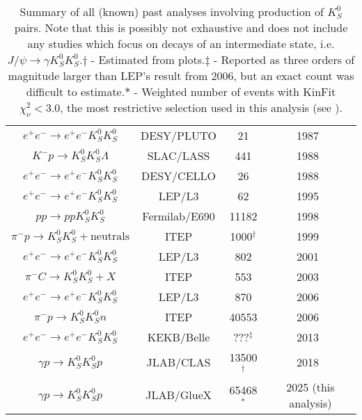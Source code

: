 \begin{table}
\begin{center}
\begin{tabular}{cccc}
      $e^+e^- \to e^+e^- K_S^0 K_S^0$ & DESY/PLUTO & 21 & 1987~\cite{berger_tensor_1988}\\
      $K^- p \to K_S^0 K_S^0 \Lambda$ & SLAC/LASS & 441 & 1988~\cite{aston_study_1988}\\
      $e^+e^- \to e^+e^- K_S^0 K_S^0$ & DESY/CELLO & 26 & 1988~\cite{behrend_theks0ks0final_1989}\\
      $e^+e^- \to e^+e^- K_S^0 K_S^0$ & LEP/L3 & 62 & 1995~\cite{acciarri_study_1995}\\
      $pp \to pp K_S^0 K_S^0$ & Fermilab/E690 & 11182 & 1998~\cite{reyes_partial_1998}\\
      $\pi^- p \to K_S^0 K_S^0 + \text{neutrals}$ & ITEP & 1000${}^\dagger$ & 1999~\cite{barkov_discovery_1999}\\
      $e^+e^- \to e^+e^- K_S^0 K_S^0$ & LEP/L3 & 802 & 2001~\cite{acciarri_k0sk0s_2001}\\
      $\pi^- C \to K_S^0 K_S^0 + X$ & ITEP & 553 & 2003~\cite{tikhomirov_resonances_2003}\\
      $e^+e^- \to e^+e^- K_S^0 K_S^0$ & LEP/L3 & 870 & 2006~\cite{schegelsky_k0_2006}\\
      $\pi^- p \to K_S^0 K_S^0 n$ & ITEP & 40553 & 2006~\cite{vladimirsky_analysis_2006}\\
      $e^+e^- \to e^+e^- K_S^0 K_S^0$ & KEKB/Belle & ???${}^\ddagger$ & 2013~\cite{uehara_high-statistics_2013}\\
      $\gamma p \to K_S^0 K_S^0 p$ & JLAB/CLAS & 13500${}^\dagger$ & 2018~\cite{the_clas_collaboration_double_2018}\\
      $\gamma p \to K_S^0 K_S^0 p$ & JLAB/GlueX & 65468${}^\ast$ & 2025 (this analysis)\\\bottomrule
    \end{tabular}
    \caption{Summary of all (known) past analyses involving production of $K_S^0$ pairs. Note that this is possibly not exhaustive and does not include any studies which focus on decays of an intermediate state, i.e. $J/\psi \to \gamma K_S^0K_S^0$.\newline$\dagger$ - Estimated from plots.\newline$\ddagger$ - Reported as three orders of magnitude larger than LEP's result from 2006, but an exact count was difficult to estimate.\newline$\ast$ - Weighted number of events with KinFit $\chi^2_\nu < 3.0$, the most restrictive selection used in this analysis (see ).}\label{tab:past-analyses}
  \end{center}
\end{table}
